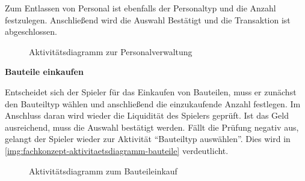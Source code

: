Zum Entlassen von Personal ist ebenfalls der Personaltyp und die Anzahl festzulegen. Anschließend wird die Auswahl Bestätigt und die Transaktion ist abgeschlossen. 

\begin{figure}[h]
  \centering
  \caption{Aktivitätsdiagramm zur Personalverwaltung}
  \label{img:fachkonzept-aktivitaetsdiagramm-personal}
\end{figure}

\medskip

\textbf{Bauteile einkaufen}

Entscheidet sich der Spieler für das Einkaufen von Bauteilen, muss er zunächst den Bauteiltyp wählen und anschließend die einzukaufende Anzahl festlegen. Im Anschluss daran wird wieder die Liquidität des Spielers geprüft. Ist das Geld ausreichend, muss die Auswahl bestätigt werden. Fällt die Prüfung negativ aus, gelangt der Spieler wieder zur Aktivität “Bauteiltyp auswählen”. Dies wird in \vref{img:fachkonzept-aktivitaetsdiagramm-bauteile} verdeutlicht.

\begin{figure}[h]
  \centering
  \caption{Aktivitätsdiagramm zum Bauteileinkauf}
  \label{img:fachkonzept-aktivitaetsdiagramm-bauteile}
\end{figure}

